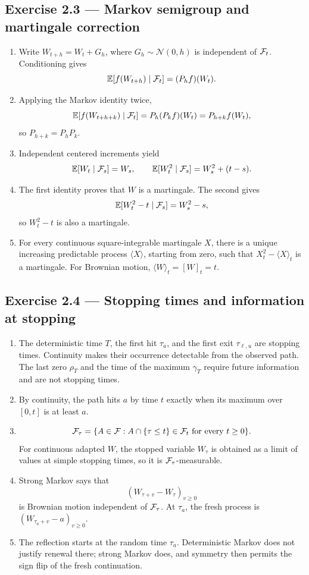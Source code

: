 \subsection*{Exercise 2.3 --- Markov semigroup and martingale correction}
\begin{enumerate}
  \item Write \(W_{t+h}=W_t+G_h\), where
  \(G_h\sim\mathcal N(0,h)\) is independent of \(\mathcal{F}_t\). Conditioning gives
  \[
  \mathbb{E}[f(W_{t+h})\mid\mathcal{F}_t]=(P_hf)(W_t).
  \]
  \item Applying the Markov identity twice,
  \[
  \mathbb{E}[f(W_{t+h+k})\mid\mathcal{F}_t]
  =P_h(P_kf)(W_t)=P_{h+k}f(W_t),
  \]
  so \(P_{h+k}=P_hP_k\).
  \item Independent centered increments yield
  \[
  \mathbb{E}[W_t\mid\mathcal{F}_s]=W_s,
  \qquad
  \mathbb{E}[W_t^2\mid\mathcal{F}_s]=W_s^2+(t-s).
  \]
  \item The first identity proves that \(W\) is a martingale. The second
  gives
  \[
  \mathbb{E}[W_t^2-t\mid\mathcal{F}_s]=W_s^2-s,
  \]
  so \(W_t^2-t\) is also a martingale.
  \item For every continuous square-integrable martingale \(X\), there is a
  unique increasing predictable process \(\langle X\rangle\), starting from
  zero, such that \(X_t^2-\langle X\rangle_t\) is a martingale. For Brownian
  motion, \(\langle W\rangle_t=[W]_t=t\).
\end{enumerate}

\subsection*{Exercise 2.4 --- Stopping times and information at stopping}
\begin{enumerate}
  \item The deterministic time \(T\), the first hit \(\tau_a\), and the
  first exit \(\tau_{\ell,u}\) are stopping times. Continuity makes their
  occurrence detectable from the observed path. The last zero \(\rho_T\)
  and the time of the maximum \(\gamma_T\) require future information and
  are not stopping times.
  \item By continuity, the path hits \(a\) by time \(t\) exactly when its
  maximum over \([0,t]\) is at least \(a\).
  \item
  \[
  \mathcal{F}_\tau=\{A\in\mathcal{F}:A\cap\{\tau\leq t\}\in\mathcal{F}_t
  \text{ for every }t\geq0\}.
  \]
  For continuous adapted \(W\), the stopped variable \(W_\tau\) is obtained
  as a limit of values at simple stopping times, so it is
  \(\mathcal{F}_\tau\)-measurable.
  \item Strong Markov says that
  \[
  (W_{\tau+v}-W_\tau)_{v\geq0}
  \]
  is Brownian motion independent of \(\mathcal{F}_\tau\). At \(\tau_a\), the fresh
  process is \((W_{\tau_a+v}-a)_{v\geq0}\).
  \item The reflection starts at the random time \(\tau_a\). Deterministic
  Markov does not justify renewal there; strong Markov does, and symmetry then
  permits the sign flip of the fresh continuation.
\end{enumerate}

